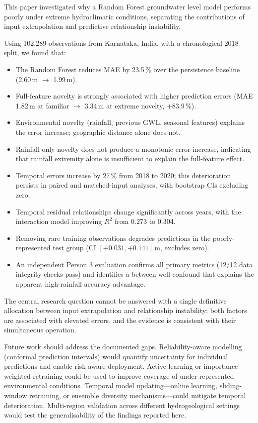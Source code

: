 \documentclass[conference]{IEEEtran}
\begin{document}
This paper investigated why a Random Forest groundwater level model
performs poorly under extreme hydroclimatic conditions, separating the
contributions of input extrapolation and predictive relationship
instability.

Using 102{,}289 observations from Karnataka, India, with a chronological
2018 split, we found that:

\begin{itemize}
  \item The Random Forest reduces MAE by 23.5\,\% over the persistence
        baseline (2.60\,m $\rightarrow$ 1.99\,m).
  \item Full-feature novelty is strongly associated with higher prediction
        errors (MAE 1.82\,m at familiar $\rightarrow$ 3.34\,m at extreme
        novelty, $+$83.9\,\%).
  \item Environmental novelty (rainfall, previous GWL, seasonal features)
        explains the error increase; geographic distance alone does not.
  \item Rainfall-only novelty does not produce a monotonic error increase,
        indicating that rainfall extremity alone is insufficient to explain
        the full-feature effect.
  \item Temporal errors increase by 27\,\% from 2018 to 2020; this
        deterioration persists in paired and matched-input analyses,
        with bootstrap CIs excluding zero.
  \item Temporal residual relationships change significantly across years,
        with the interaction model improving $R^{2}$ from 0.273 to 0.304.
  \item Removing rare training observations degrades predictions
        in the poorly-represented test group
        (CI $[+0.031, +0.141]$\,m, excludes zero).
  \item An independent Person 3 evaluation confirms all primary metrics
        (12/12 data integrity checks pass) and identifies a
        between-well confound that explains the apparent high-rainfall
        accuracy advantage.
\end{itemize}

The central research question cannot be answered with a single definitive
allocation between input extrapolation and relationship instability:
both factors are associated with elevated errors, and the evidence is
consistent with their simultaneous operation.

Future work should address the documented gaps.
Reliability-aware modelling (conformal prediction intervals) would
quantify uncertainty for individual predictions and enable risk-aware
deployment.
Active learning or importance-weighted retraining could be used to
improve coverage of under-represented environmental conditions.
Temporal model updating---online learning, sliding-window retraining,
or ensemble diversity mechanisms---could mitigate temporal deterioration.
Multi-region validation across different hydrogeological settings would
test the generalisability of the findings reported here.
\end{document}
